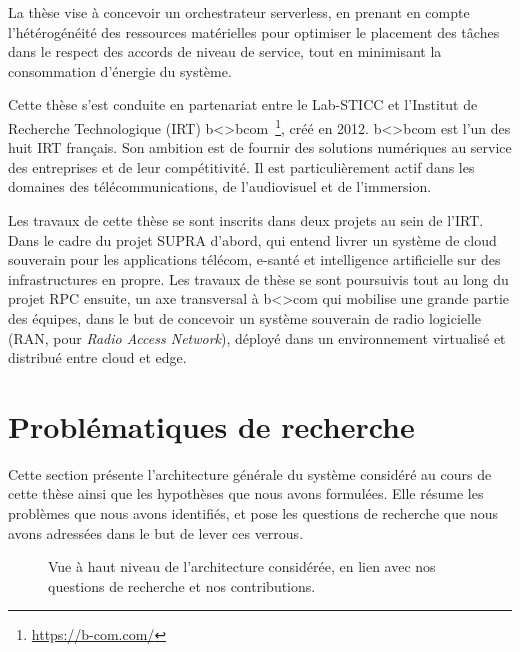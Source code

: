 La thèse vise à concevoir un orchestrateur serverless, en prenant en compte l’hétérogénéité des ressources matérielles pour optimiser le placement des tâches dans le respect des accords de niveau de service, tout en minimisant la consommation d'énergie du système.

Cette thèse s'est conduite en partenariat entre le Lab-STICC et l'Institut de Recherche Technologique (IRT) b{\textless\textgreater}bcom~\footnote{\href{https://b-com.com/}{https://b-com.com/}}, créé en 2012. b{\textless\textgreater}bcom est l'un des huit IRT français. Son ambition est de fournir des solutions numériques au service des entreprises et de leur compétitivité. Il est particulièrement actif dans les domaines des télécommunications, de l'audiovisuel et de l'immersion.

Les travaux de cette thèse se sont inscrits dans deux projets au sein de l'IRT. Dans le cadre du projet SUPRA d'abord, qui entend livrer un système de cloud souverain pour les applications télécom, e-santé et intelligence artificielle sur des infrastructures en propre. Les travaux de thèse se sont poursuivis tout au long du projet RPC ensuite, un axe transversal à b{\textless\textgreater}com qui mobilise une grande partie des équipes, dans le but de concevoir un système souverain de radio logicielle (RAN, pour \textit{Radio Access Network}), déployé dans un environnement virtualisé et distribué entre cloud et edge.

\section{Problématiques de recherche}

Cette section présente l'architecture générale du système considéré au cours de cette thèse ainsi que les hypothèses que nous avons formulées. Elle résume les problèmes que nous avons identifiés, et pose les questions de recherche que nous avons adressées dans le but de lever ces verrous.

\begin{figure}[h!]
    \centering
    
	\caption{Vue à haut niveau de l'architecture considérée, en lien avec nos questions de recherche et nos contributions.}
	\label{fig:intro-architecture}
\end{figure}

